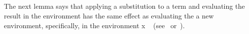 \begin{code}
%
\>[1]\AgdaSpace{}%
\AgdaSymbol{:}\AgdaSpace{}%
\AgdaSymbol{\{}\AgdaSpace{}%
\AgdaSymbol{:}\AgdaSpace{}%
\AgdaSpace{}%
\AgdaSymbol{\}}\AgdaSpace{}%
\AgdaSpace{}%
\AgdaSpace{}%
\AgdaSymbol{(}\AgdaSpace{}%
\AgdaSymbol{\{}\AgdaSpace{}%
\AgdaSymbol{=}\AgdaSpace{}%
\AgdaSymbol{\})}\<%
\\
%
\>[1]%
\>[9]\AgdaSpace{}%
\AgdaSymbol{=}\AgdaSpace{}%
\AgdaSpace{}%
\AgdaBound{\AgdaUnderscore{}}%
\>[35]\AgdaSpace{}%
\<%
\\
%
\>[1]%
\>[9]\AgdaSpace{}%
\AgdaSymbol{=}\AgdaSpace{}%
\AgdaSpace{}%
\AgdaSpace{}%
%
\>[35]\AgdaSpace{}%
\AgdaSpace{}%
\AgdaSymbol{(}\AgdaSpace{}%
\AgdaSymbol{)}\<%
\\
%
\>[1]%
\>[9]\AgdaSpace{}%
\AgdaSymbol{=}\AgdaSpace{}%
\AgdaSpace{}%
\AgdaSpace{}%
\AgdaSpace{}%
%
\>[35]\AgdaSpace{}%
\AgdaSpace{}%
\AgdaSymbol{(}\AgdaSpace{}%
\AgdaSymbol{)}\AgdaSpace{}%
\AgdaSymbol{(}\AgdaSpace{}%
\AgdaSymbol{)}\<%
\\
\>[0]\<%
\end{code}
\fi

The next lemma says that applying a substitution  to a term 
and evaluating the result in the environment  has the same effect as evaluating
 the a new environment, specifically, in the environment  \ab x  ~
 (see~\cite{Abel:2021} or~\cite[Lem.~3.3.11]{Mitchell:1996}).

